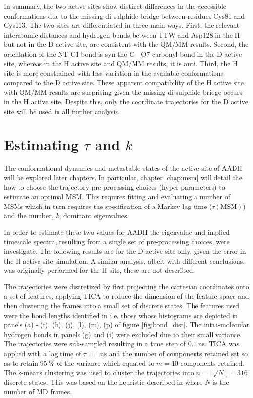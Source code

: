 In summary, the two active sites show distinct differences in the accessible conformations due to the missing di-sulphide bridge between residues Cys81 and Cys113. The two sites are differentiated in three main ways. First, the relevant interatomic distances and hydrogen bonds between TTW and Asp128 in the H but not in the D active site, are consistent with the QM/MM results. Second, the orientation of the NT-C1 bond is syn the C---O7 carbonyl bond in the D active site, whereas in the H active site and QM/MM results, it is anti. Third, the H site is more constrained with less variation in the available conformations compared to the  D active site. These apparent compatibility of the H active site with QM/MM results are surprising given the missing di-sulphide bridge occurs in the H active site. Despite this, only the  coordinate trajectories for the D active site will be used in all further analysis.  

\section{Estimating $\tau$ and $k$}\label{sec:aadh_msm}

The conformational dynamics and metastable states of the active site of AADH will be explored later chapters. In particular, chapter \ref{chap:msm} will detail the how to choose the trajectory pre-processing choices (hyper-parameters) to estimate an optimal MSM. This requires fitting and evaluating a number of MSMs which in turn requires the specification of a Markov lag time ($\tau(\mathrm{MSM})$) and the number, $k$, dominant eigenvalues. 

In order to estimate these two values for AADH the eigenvalue and implied timescale spectra, resulting from a single set of pre-processing choices, were investigate. The following results are for the D active site only, given the error in the H active site simulation. A similar analysis, albeit with different conclusions, was originally performed for the H site, these are not described. 

The trajectories were discretized by first projecting the cartesian coordinates onto a set of features, applying TICA to reduce the dimension of the feature space and then clustering the frames into a small set of discrete states.  The features used were the bond lengths identified in \cite{ranaghanInitioQMMM2017} i.e. those whose histograms are depicted in panels (a) - (f), (h), (j), (l), (m), (p) of figure \ref{fig:bond_dist}. The intra-molecular hydrogen bonds in panels (g) and (i) were excluded due to their small variance. The trajectories were sub-sampled resulting in a time step of $\SI{0.1}{\nano\second}$. TICA was applied with a lag time of $\tau=\SI{1}{\nano\second}$ and the number of components retained set so as to retain $\SI{95}{\percent}$ of the variance which equated to $m=10$ components retained. The k-means clustering was used to cluster the trajectories into $n=\lfloor\sqrt{N}\rfloor = 316$ discrete states. This was based on the heuristic described in \cite{husicWardClusteringImproves2017a} where $N$ is the number of MD frames.  

